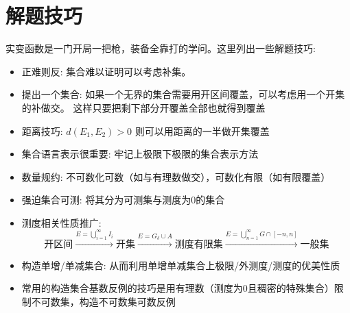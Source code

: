 \section{解题技巧}
实变函数是一门开局一把枪，装备全靠打的学问。这里列出一些解题技巧:
\begin{itemize}
    \item 正难则反: 集合难以证明可以考虑补集。
    \item 提出一个集合: 如果一个无界的集合需要用开区间覆盖，可以考虑用一个开集的补做交。
        这样只要把剩下部分开覆盖全部也就得到覆盖
    \item 距离技巧: \(d(E_{1},E_{2})>0\) 则可以用距离的一半做开集覆盖
    \item 集合语言表示很重要: 牢记上极限下极限的集合表示方法
    \item 数量规约: 不可数化可数（如与有理数做交），可数化有限（如有限覆盖）
    \item 强迫集合可测: 将其分为可测集与测度为0的集合
    \item 测度相关性质推广: \[
            \text{开区间}
            \xrightarrow{E=\bigcup_{i=1}^{\infty} I_{i}}
            \text{开集} \xrightarrow{E=G_{\delta} \cup A}
            \text{测度有限集}
            \xrightarrow{E=\bigcup_{n=1}^{\infty} G\cap
            [-n,n]} \text{一般集}
        \]
    \item 构造单增/单减集合: 从而利用单增单减集合上极限/外测度/测度的优美性质
    \item 常用的构造集合基数反例的技巧是用有理数（测度为0且稠密的特殊集合）限制不可数集，构造不可数集可数反例
\end{itemize}

